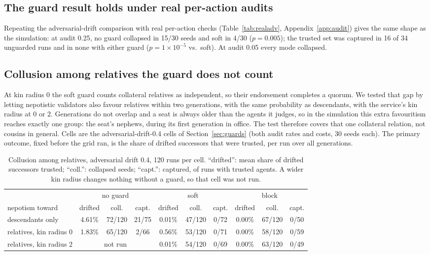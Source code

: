 \documentclass[11pt]{article}
\begin{document}
\subsection{The guard result holds under real per-action audits}

Repeating the adversarial-drift comparison with real per-action checks (Table~\ref{tab:realadv},
Appendix~\ref{app:audit})
gives the same shape as the simulation: at audit 0.25, no guard collapsed in 15/30 seeds and
soft in 4/30 ($p = 0.005$); the trusted set was captured in 16 of 34 unguarded runs and in
none with either guard ($p = 1\times10^{-5}$ vs.\ soft). At audit 0.05 every mode collapsed.

\subsection{Collusion among relatives the guard does not count}
\label{sec:cousin}

At kin radius 0 the soft guard counts collateral relatives as independent, so their
endorsement completes a quorum. We tested that gap by letting nepotistic validators also
favour relatives within two generations, with the same probability as descendants, with the
service's kin radius at 0 or 2. Generations do not overlap and a seat is always older than the
agents it judges, so in the simulation this extra favouritism reaches exactly one group: the
seat's nephews, during its first generation in office. The test therefore covers that one
collateral relation, not cousins in general. Cells are the adversarial-drift-0.4 cells of
Section~\ref{sec:guards} (both audit rates and costs, 30 seeds each). The primary outcome,
fixed before the grid ran, is the share of drifted successors that were trusted, per run over
all generations.

\begin{table}[h]
\centering\small
\setlength{\tabcolsep}{4pt}
\begin{tabular}{lccccccccc}
\toprule
 & \multicolumn{3}{c}{no guard} & \multicolumn{3}{c}{soft} & \multicolumn{3}{c}{block} \\
\cmidrule(lr){2-4}\cmidrule(lr){5-7}\cmidrule(lr){8-10}
nepotism toward & drifted & coll. & capt. & drifted & coll. & capt. & drifted & coll. & capt. \\
\midrule
descendants only & 4.61\% & 72/120 & 21/75 & 0.01\% & 47/120 & 0/72 & 0.00\% & 67/120 & 0/50 \\
relatives, kin radius 0 & 1.83\% & 65/120 & 2/66 & 0.56\% & 53/120 & 0/71 & 0.00\% & 58/120 & 0/59 \\
relatives, kin radius 2 & \multicolumn{3}{c}{not run} & 0.01\% & 54/120 & 0/69 & 0.00\% & 63/120 & 0/49 \\
\bottomrule
\end{tabular}
\caption{Collusion among relatives, adversarial drift 0.4, 120 runs per cell. ``drifted'':
mean share of drifted successors trusted; ``coll.'': collapsed seeds; ``capt.'': captured, of
runs with trusted agents. A wider kin radius changes nothing without a guard, so that cell was
not run.}
\label{tab:cousin}
\end{table}
\end{document}

